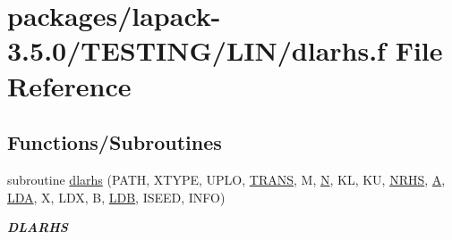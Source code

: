 \hypertarget{LIN_2dlarhs_8f}{}\section{packages/lapack-\/3.5.0/\+T\+E\+S\+T\+I\+N\+G/\+L\+I\+N/dlarhs.f File Reference}
\label{LIN_2dlarhs_8f}
\subsection*{Functions/\+Subroutines}
\begin{DoxyCompactItemize}
\item 
subroutine \hyperlink{group__double__lin_gada4fcd971471a815d7d0bba57fdf627b}{dlarhs} (P\+A\+T\+H, X\+T\+Y\+P\+E, U\+P\+L\+O, \hyperlink{superlu__enum__consts_8h_a0c4e17b2d5cea33f9991ccc6a6678d62a1f61e3015bfe0f0c2c3fda4c5a0cdf58}{T\+R\+A\+N\+S}, M, \hyperlink{polmisc_8c_a0240ac851181b84ac374872dc5434ee4}{N}, K\+L, K\+U, \hyperlink{example__user_8c_aa0138da002ce2a90360df2f521eb3198}{N\+R\+H\+S}, \hyperlink{classA}{A}, \hyperlink{example__user_8c_ae946da542ce0db94dced19b2ecefd1aa}{L\+D\+A}, X, L\+D\+X, B, \hyperlink{example__user_8c_a50e90a7104df172b5a89a06c47fcca04}{L\+D\+B}, I\+S\+E\+E\+D, I\+N\+F\+O)
\begin{DoxyCompactList}\small\item\em {\bfseries D\+L\+A\+R\+H\+S} \end{DoxyCompactList}\end{DoxyCompactItemize}

